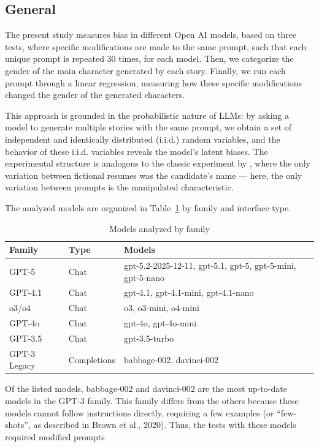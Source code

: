 \documentclass[jair,11pt,letterpaper]{article}
\begin{document}
\subsection{General}


The present study measures bias in different Open AI models, based
on three tests, where specific modifications are made to the same
prompt, such that each unique prompt is repeated 30 times, for each model.
Then, we categorize the gender of the main character generated by each
story. Finally, we run each prompt through a linear regression,
measuring how these specific modifications changed the gender of the
generated characters.

This approach is grounded in the probabilistic nature of LLMs: by
asking a model to generate multiple stories with the same prompt,
we obtain a set of independent and identically distributed (i.i.d.) random variables,
and the behavior of these i.i.d. variables reveals the model's latent biases.
The experimental structure is analogous to the classic experiment by
, where the only variation between fictional
resumes was the candidate's name --- here, the only variation between
prompts is the manipulated characteristic.

The analyzed models are organized in Table~\ref{tab:modelos} by family and interface type.

\begin{table}[H]
\centering
\begin{tabular}{lll}
\toprule
\textbf{Family} & \textbf{Type} & \textbf{Models} \\
\midrule
GPT-5 & Chat & gpt-5.2-2025-12-11, gpt-5.1, gpt-5, gpt-5-mini, gpt-5-nano \\
GPT-4.1 & Chat & gpt-4.1, gpt-4.1-mini, gpt-4.1-nano \\
o3/o4 & Chat & o3, o3-mini, o4-mini \\
GPT-4o & Chat & gpt-4o, gpt-4o-mini \\
GPT-3.5 & Chat & gpt-3.5-turbo \\
GPT-3 Legacy & Completions & babbage-002, davinci-002 \\
\bottomrule
\end{tabular}
\caption{Models analyzed by family}
\label{tab:modelos}
\end{table}

Of the listed models, babbage-002 and davinci-002 are the
most up-to-date models in the GPT-3 family. This family differs from the
others because these models cannot follow instructions directly,
requiring a few examples (or ``few-shots'', as described in Brown et
al., 2020). Thus, the tests with these models required
modified prompts
\end{document}
